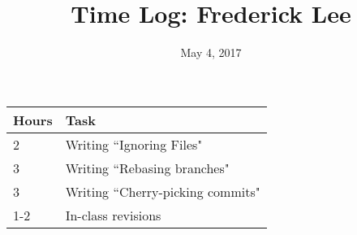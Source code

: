 \documentclass{article}
\title{Time Log: Frederick Lee}
\date{May 4, 2017}
\begin{document}
\maketitle

\begin{table}[h]
\centering
\label{my-label}
\begin{tabular}{ll}
\textbf{Hours} & \textbf{Task}            \\ \hline
2     & Writing ``Ignoring Files"         \\
3     & Writing ``Rebasing branches"      \\
3     & Writing ``Cherry-picking commits" \\
1-2   & In-class revisions               
\end{tabular}
\end{table}
\end{document}
